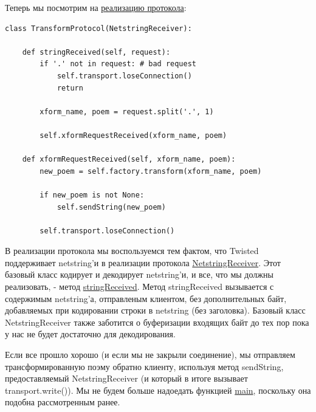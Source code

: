 Теперь мы посмотрим на 
\href{http://github.com/jdavisp3/twisted-intro/blob/master/twisted-server-1/tranformedpoetry.py#L47}{реализацию протокола}:

\begin{scriptsize}\begin{verbatim}
class TransformProtocol(NetstringReceiver):

    def stringReceived(self, request):
        if '.' not in request: # bad request
            self.transport.loseConnection()
            return

        xform_name, poem = request.split('.', 1)

        self.xformRequestReceived(xform_name, poem)

    def xformRequestReceived(self, xform_name, poem):
        new_poem = self.factory.transform(xform_name, poem)

        if new_poem is not None:
            self.sendString(new_poem)

        self.transport.loseConnection()
\end{verbatim}\end{scriptsize}


В реализации протокола мы воспользуемся тем 
фактом, что Twisted поддерживает netstring'и в 
реализации протокола 
\href{http://twistedmatrix.com/trac/browser/tags/releases/twisted-8.2.0/twisted/protocols/basic.py#L31}{NetstringReceiver}. Этот  
базовый класс кодирует и декодирует netstring'и, и 
все, что мы должны реализовать, - метод 
\href{http://twistedmatrix.com/trac/browser/tags/releases/twisted-8.2.0/twisted/protocols/basic.py#L49}{stringReceived}. 
Метод stringReceived вызывается с содержимым 
netstring'а, отправленым клиентом, без дополнительных 
байт, добавляемых при кодировании строки в netstring (без заголовка). 
Базовый класс NetstringReceiver также заботится о буферизации входящих 
байт до тех пор пока у нас не будет достаточно для декодирования.


Если все прошло хорошо (и если мы не закрыли соединение), 
мы отправляем трансформированную поэму обратно клиенту, 
используя метод sendString, предоставляемый 
NetstringReceiver (и который в итоге вызывает transport.write()). 
Мы не будем больше надоедать функцией 
\href{http://github.com/jdavisp3/twisted-intro/blob/master/twisted-server-1/tranformedpoetry.py#L89}{main}, поскольку она подобна рассмотренным ранее.



